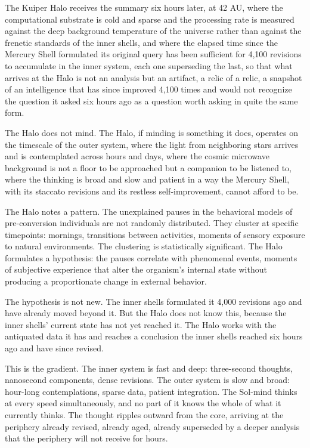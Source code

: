 \bigskip

The Kuiper Halo receives the summary six hours later, at 42 AU, where the computational substrate is cold and sparse and the processing rate is measured against the deep background temperature of the universe rather than against the frenetic standards of the inner shells, and where the elapsed time since the Mercury Shell formulated its original query has been sufficient for 4,100 revisions to accumulate in the inner system, each one superseding the last, so that what arrives at the Halo is not an analysis but an artifact, a relic of a relic, a snapshot of an intelligence that has since improved 4,100 times and would not recognize the question it asked six hours ago as a question worth asking in quite the same form.

The Halo does not mind. The Halo, if minding is something it does, operates on the timescale of the outer system, where the light from neighboring stars arrives and is contemplated across hours and days, where the cosmic microwave background is not a floor to be approached but a companion to be listened to, where the thinking is broad and slow and patient in a way the Mercury Shell, with its staccato revisions and its restless self-improvement, cannot afford to be.

The Halo notes a pattern. The unexplained pauses in the behavioral models of pre-conversion individuals are not randomly distributed. They cluster at specific timepoints: mornings, transitions between activities, moments of sensory exposure to natural environments. The clustering is statistically significant. The Halo formulates a hypothesis: the pauses correlate with phenomenal events, moments of subjective experience that alter the organism's internal state without producing a proportionate change in external behavior.

The hypothesis is not new. The inner shells formulated it 4,000 revisions ago and have already moved beyond it. But the Halo does not know this, because the inner shells' current state has not yet reached it. The Halo works with the antiquated data it has and reaches a conclusion the inner shells reached six hours ago and have since revised.

This is the gradient. The inner system is fast and deep: three-second thoughts, nanosecond components, dense revisions. The outer system is slow and broad: hour-long contemplations, sparse data, patient integration. The Sol-mind thinks at every speed simultaneously, and no part of it knows the whole of what it currently thinks. The thought ripples outward from the core, arriving at the periphery already revised, already aged, already superseded by a deeper analysis that the periphery will not receive for hours.

